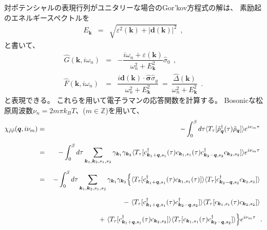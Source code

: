 \documentclass[a4j]{jsarticle}
\begin{document}
対ポテンシャルの表現行列がユニタリーな場合のGor'kov方程式の解は、
素励起のエネルギースペクトルを
%
%
%
%
\begin{eqnarray}
	E_{\bm{k}}
	&=&
	\sqrt{
		\varepsilon^{2}(\bm{k}) + | \bm{d}(\bm{k}) |^{2}
	}
	\ \ ,
\end{eqnarray}
%
%
%
%
と書いて、
%
%
%
%
\begin{eqnarray}
	\hat{G}(\bm{k} , i \omega_{n})
	&=&
	-
	\dfrac{ i \omega_{n} + \varepsilon(\bm{k}) }
	{ \omega_{n}^{2} + E_{\bm{k}}^{2} }
	\hat{\sigma}_{0}
	\ \ ,
	\\[2mm]
	\hat{F}(\bm{k},i \omega_{n})
	&=&
	\dfrac{ i \bm{d}(\bm{k}) \cdot \hat{\bm{\sigma}} \hat{\sigma}_{y} }
	{ \omega_{n}^{2} + E_{\bm{k}}^{2} }
	\ = \
	\dfrac{ \hat{\Delta}(\bm{k}) }
	{ \omega_{n}^{2} + E_{\bm{k}}^{2} }
	\ \ .
\end{eqnarray}
%
%
%
%
と表現できる。
これらを用いて電子ラマンの応答関数を計算する。
Bosonicな松原周波数$\nu_{n}=2m\pi k_{B} T$、($m \in \mathbb{Z}$)を用いて、
%
%
%
%
\begin{eqnarray}
	\chi_{\tilde{\rho} \tilde{\rho}}(\bm{q},i \nu_{m})
	&=&
	-
	\int^{\beta}_{0} d \tau
	\langle T_{\tau}[ \tilde{\rho}_{\bm{q}}^{\dagger} (\tau) \tilde{\rho}_{\bm{q}} ] \rangle
	e^{i \nu_{m} \tau}
	\nonumber \ \\[2mm]
	&=&
	-
	\int^{\beta}_{0} d \tau
	\sum_{\bm{k}_{1} , \bm{k}_{2} , s_{1} ,s_{2} }
	\gamma_{\bm{k}_{1}}
	\gamma_{\bm{k}_{2}}
	\langle T_{\tau} [
			c_{ \bm{k}_{1}+\bm{q} , s_{1} }^{\dagger} (\tau)
			c_{ \bm{k}_{1} , s_{1} } (\tau)
			c_{ \bm{k}_{2}-\bm{q} , s_{2} }^{\dagger}
			c_{ \bm{k}_{2} , s_{2} }
		] \rangle
	e^{i \nu_{m} \tau}
	\nonumber \ \\[2mm]
	&=&
	-
	\int^{\beta}_{0} d \tau
	\sum_{\bm{k}_{1} , \bm{k}_{2} , s_{1} ,s_{2} }
	\gamma_{\bm{k}_{1}}
	\gamma_{\bm{k}_{2}}
	\Big\{
	\langle T_{\tau} [
			c_{ \bm{k}_{1}+\bm{q} , s_{1} }^{\dagger} (\tau)
			c_{ \bm{k}_{1} , s_{1} } (\tau)
		] \rangle
	\langle T_{\tau} [
			c_{ \bm{k}_{2}-\bm{q} , s_{2} }^{\dagger}
			c_{ \bm{k}_{2} , s_{2} }
		] \rangle
	\nonumber \ \\[2mm]
	&& \hspace{25mm} - \
	\langle T_{\tau} [
			c_{ \bm{k}_{1}+\bm{q} , s_{1} }^{\dagger} (\tau)
			c_{ \bm{k}_{2}-\bm{q} , s_{2} }^{\dagger}
		] \rangle
	\langle T_{\tau} [
			c_{ \bm{k}_{1} , s_{1} } (\tau)
			c_{ \bm{k}_{2} , s_{2} }
		] \rangle
	\nonumber \ \\[2mm]
	&& \hspace{25mm} + \
	\langle T_{\tau} [
			c_{ \bm{k}_{1}+\bm{q} , s_{1} }^{\dagger} (\tau)
			c_{ \bm{k}_{2} , s_{2} }
		] \rangle
	\langle T_{\tau} [
			c_{ \bm{k}_{1} , s_{1} } (\tau)
			c_{ \bm{k}_{2}-\bm{q} , s_{2} }^{\dagger}
		] \rangle
	\Big\}
	e^{i \nu_{m} \tau}
	\ \ .
\end{eqnarray}
\end{document}
